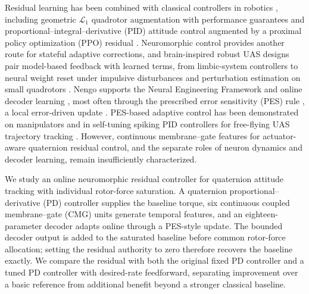 \documentclass[letterpaper, 10 pt, conference]{ieeeconf}
\begin{document}
Residual learning has been combined with classical controllers in robotics
\cite{johannink2019}, including geometric $\mathcal L_1$ quadrotor
augmentation with performance guarantees \cite{wu2025l1quad} and
proportional--integral--derivative (PID) attitude control augmented by a
proximal policy optimization (PPO) residual \cite{li2027hpappo}. Neuromorphic
control provides another route for stateful adaptive corrections, and brain-inspired robust UAS
designs pair model-based feedback with learned terms, from limbic-system controllers
\cite{rubioscola2023limbic,escareno2024limbic} to neural weight reset under impulsive
disturbances \cite{rubioscola2023weightreset} and perturbation estimation on small quadrotors
\cite{rubioscola2021mambo}. Nengo supports the Neural Engineering Framework
\cite{eliasmith2004neuraleng} and online decoder learning \cite{bekolay2014nengo}, most often
through the prescribed error sensitivity (PES) rule \cite{macneil2011pes}, a local error-driven
update \cite{voelker2015pes}. PES-based adaptive control has been demonstrated on manipulators
\cite{dewolf2016arm,dewolf2020nengo} and in self-tuning spiking PID controllers for free-flying
UAS trajectory tracking \cite{olivares2025ifac,olivares2026selftuning}. However, continuous
membrane--gate features for actuator-aware quaternion residual control, and the
separate roles of neuron dynamics and decoder learning, remain insufficiently
characterized.

We study an online neuromorphic residual controller for quaternion attitude
tracking with individual rotor-force saturation. A quaternion
proportional--derivative (PD) controller supplies the baseline torque, six
continuous coupled membrane--gate (CMG) units generate temporal features, and
an eighteen-parameter decoder adapts online through a PES-style update. The
bounded decoder output is added to the saturated baseline before common
rotor-force allocation; setting the residual authority to zero therefore
recovers the baseline exactly. We compare the residual with both the original
fixed PD controller and a tuned PD controller with desired-rate feedforward,
separating improvement over a basic reference from additional benefit beyond a
stronger classical baseline.
\end{document}
